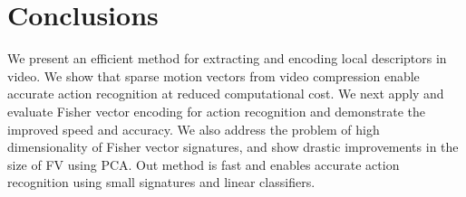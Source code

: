 \documentclass[10pt,twocolumn,letterpaper]{article}
\begin{document}
\section{Conclusions}
We present an efficient method for extracting and encoding local descriptors in video. We show that sparse motion vectors from video compression enable accurate action recognition at reduced computational cost. We next apply and evaluate Fisher vector encoding for action recognition and demonstrate the improved speed and accuracy.
We also address the problem of high dimensionality of Fisher vector signatures, and show drastic improvements in the size of FV using PCA. 
Out method is fast and enables accurate action recognition using small signatures and linear classifiers.






{
\small


}
\end{document}
